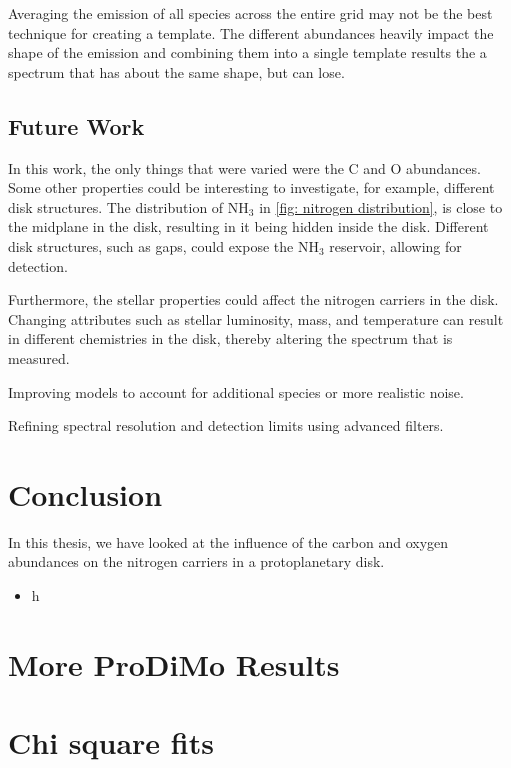 \documentclass[twoside, single, authoryear, semicolon, 12pt]{lion-msc}
\newcommand{\4}{$_4$}
\newcommand{\3}{$_3$}
\newcommand{\2}{$_2$}
\begin{document}
Averaging the emission of all species across the entire grid may not be the best technique for creating a template. The different abundances heavily impact the shape of the emission and combining them into a single template results the a spectrum that has about the same shape, but can lose.

\section{Future Work}
In this work, the only things that were varied were the C and O abundances. Some other properties could be interesting to investigate, for example, different disk structures. The distribution of NH\3 in \autoref{fig: nitrogen distribution}, is close to the midplane in the disk, resulting in it being hidden inside the disk. Different disk structures, such as gaps, could expose the NH\3 reservoir, allowing for detection. 

Furthermore, the stellar properties could affect the nitrogen carriers in the disk. Changing attributes such as stellar luminosity, mass, and temperature can result in different chemistries in the disk, thereby altering the spectrum that is measured. 

Improving models to account for additional species or more realistic noise.

Refining spectral resolution and detection limits using advanced filters.

\chapter{Conclusion}\label{Ch: Conclusion}
In this thesis, we have looked at the influence of the carbon and oxygen abundances on the nitrogen carriers in a protoplanetary disk. 
\begin{itemize}
    \item h
\end{itemize}


\appendix
\chapter{More ProDiMo Results}
\chapter{Chi square fits}
\end{document}
